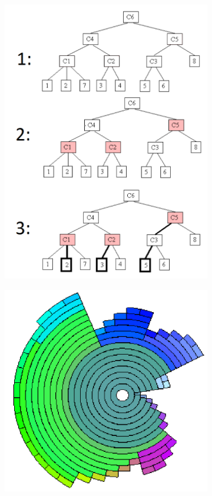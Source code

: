 \begin{figure}[h!]
  \centering
  \begin{subfigure}[b]{0.4\textwidth}
    \centering
    \includegraphics[width=\textwidth]{images/vhdr1.png}
    \caption{}
    \label{fig:vhdr1}
  \end{subfigure}%
  \qquad %
  \begin{subfigure}[b]{0.45\textwidth}
    \centering
    \includegraphics[width=\textwidth]{images/vhdr2.png}

\end{subfigure}
\end{figure}
